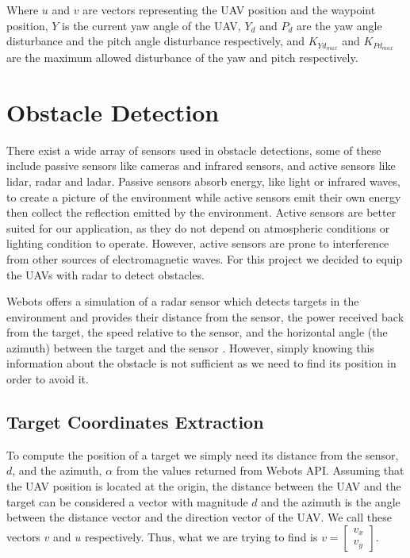 
Where $u$ and $v$ are vectors representing the UAV position and the waypoint position, $Y$ is the current 
yaw angle of the UAV, $Y_d$ and $P_d$ are the yaw angle disturbance and the pitch angle disturbance
respectively, and $K_{Yd_{max}}$ and $K_{Pd_{max}}$ are the maximum allowed disturbance of the yaw and 
pitch respectively.

\section{Obstacle Detection}

There exist a wide array of sensors used in obstacle detections, some of these include passive
sensors like cameras and infrared sensors, and active sensors like lidar, radar and ladar. 
Passive sensors absorb energy, like light or infrared waves, to create a picture of the 
environment while active sensors emit their own energy then collect the reflection emitted
by the environment. Active sensors are better suited for our application, as they do not
depend on atmospheric conditions or lighting condition to operate. However, active sensors
are prone to interference from other sources of electromagnetic waves. \autocite{4432828}
For this project we decided to equip the UAVs with radar to detect obstacles. 

Webots offers a simulation of a radar sensor which detects targets in the environment and 
provides their distance from the sensor, the power received back from the target, the speed relative 
to the sensor, and the horizontal angle (the azimuth) between the target and the sensor \autocite{Webots}.
However, simply knowing this information about the obstacle is not sufficient as we need to find
its position in order to avoid it.

\subsection{Target Coordinates Extraction}

To compute the position of a target we simply need its distance from the sensor, $d$, and the azimuth, 
$\alpha$ from the values returned from Webots API. Assuming that the UAV position is located at the origin,
the distance between the UAV and the target can be considered a vector with magnitude $d$ and the 
azimuth is the angle between the distance vector and the direction vector of the UAV. We call these
vectors $v$ and $u$ respectively. Thus, what we are trying to find is $v = \begin{bmatrix} v_x \\ v_y \end{bmatrix}$.

